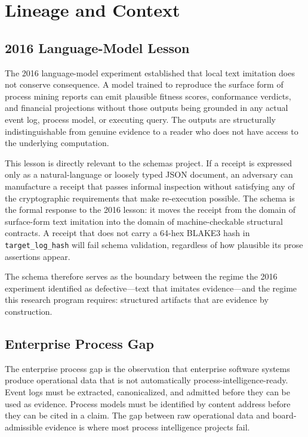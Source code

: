 
\section{Lineage and Context}
\label{sec:schemas-lineage}

\subsection{2016 Language-Model Lesson}
\label{sec:schemas-lineage-2016}

The 2016 language-model experiment established that local text imitation does not conserve
consequence. A model trained to reproduce the surface form of process mining reports can emit
plausible fitness scores, conformance verdicts, and financial projections without those outputs
being grounded in any actual event log, process model, or executing query. The outputs are
structurally indistinguishable from genuine evidence to a reader who does not have access to the
underlying computation.

This lesson is directly relevant to the schemas project. If a receipt is expressed only as a
natural-language or loosely typed JSON document, an adversary can manufacture a receipt that
passes informal inspection without satisfying any of the cryptographic requirements that make
re-execution possible. The schema is the formal response to the 2016 lesson: it moves the
receipt from the domain of surface-form text imitation into the domain of machine-checkable
structural contracts. A receipt that does not carry a 64-hex BLAKE3 hash in \texttt{target\_log\_hash}
will fail schema validation, regardless of how plausible its prose assertions appear.

The schema therefore serves as the boundary between the regime the 2016 experiment identified as
defective---text that imitates evidence---and the regime this research program requires: structured
artifacts that are evidence by construction.

\subsection{Enterprise Process Gap}
\label{sec:schemas-lineage-enterprise-gap}

The enterprise process gap is the observation that enterprise software systems produce operational
data that is not automatically process-intelligence-ready. Event logs must be extracted,
canonicalized, and admitted before they can be used as evidence. Process models must be identified
by content address before they can be cited in a claim. The gap between raw operational data and
board-admissible evidence is where most process intelligence projects fail.

